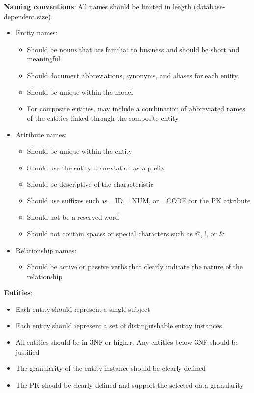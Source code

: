 \documentclass[a4paper, 12pt, titlepage]{report}
\begin{document}
{\textbf{Naming conventions}: All names should be limited in length (database-dependent size).
\begin{itemize}
\item Entity names:
\begin{itemize}
\item Should be nouns that are familiar to business and should be short and meaningful
\item Should document abbreviations, synonyms, and aliases for each entity
\item Should be unique within the model
\item For composite entities, may include a combination of abbreviated names of the entities linked through the composite entity
\end{itemize}
\item Attribute names:
\begin{itemize}
\item Should be unique within the entity
\item Should use the entity abbreviation as a prefix
\item Should be descriptive of the characteristic
\item Should use suffixes such as \_ID, \_NUM, or \_CODE for the PK attribute
\item Should not be a reserved word
\item Should not contain spaces or special characters such as @, !, or \&
\end{itemize}
\item Relationship names:
\begin{itemize}
\item Should be active or passive verbs that clearly indicate the nature of the relationship
\end{itemize}
\end{itemize}
\textbf{Entities}:
\begin{itemize}
\item Each entity should represent a single subject
\item Each entity should represent a set of distinguishable entity instances
\item All entities should be in 3NF or higher. Any entities below 3NF should be justified
\item The granularity of the entity instance should be clearly defined
\item The PK should be clearly defined and support the selected data granularity
\end{itemize}
}
\end{document}
